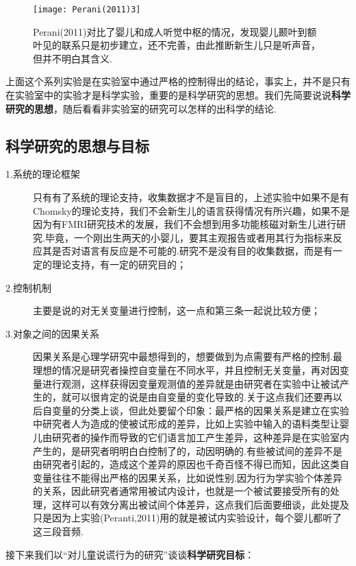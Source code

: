 \begin{figure}
	\texttt{[image: Perani(2011)3]}
	\caption[Perani(2011)3]{Perani(2011)对比了婴儿和成人听觉中枢的情况，发现婴儿颞叶到额叶见的联系只是初步建立，还不完善，由此推断新生儿只是听声音，但并不明白其含义.}
\end{figure}

上面这个系列实验是在实验室中通过严格的控制得出的结论，事实上，并不是只有在实验室中的实验才是科学实验，重要的是科学研究的思想。我们先简要说说\textbf{科学研究的思想}，随后看看非实验室的研究可以怎样的出科学的结论.

\subsection{科学研究的思想与目标}

\begin{description}
    \item[1.系统的理论框架]
    只有有了系统的理论支持，收集数据才不是盲目的，上述实验中如果不是有Chomsky的理论支持，我们不会新生儿的语言获得情况有所兴趣，如果不是因为有FMRI研究技术的发展，我们不会想到用多功能核磁对新生儿进行研究.毕竟，一个刚出生两天的小婴儿，要其主观报告或者用其行为指标来反应其是否对语言有反应是不可能的.研究不是没有目的收集数据，而是有一定的理论支持，有一定的研究目的；
    \item[2.控制机制]
    主要是说的对无关变量进行控制，这一点和第三条一起说比较方便；
    \item[3.对象之间的因果关系]
    因果关系是心理学研究中最想得到的，想要做到为点需要有严格的控制.最理想的情况是研究者操控自变量在不同水平，并且控制无关变量，再对因变量进行观测，这样获得因变量观测值的差异就是由研究者在实验中让被试产生的，就可以很肯定的说是由自变量的变化导致的.关于这点我们还要再以后自变量的分类上谈，但此处要留个印象：最严格的因果关系是建立在实验中研究者人为造成的使被试形成的差异，比如上实验中输入的语料类型让婴儿由研究者的操作而导致的它们语言加工产生差异，这种差异是在实验室内产生的，是研究者明明白白控制了的，动因明确的.有些被试间的差异不是由研究者引起的，造成这个差异的原因也千奇百怪不得已而知，因此这类自变量往往不能得出严格的因果关系，比如说性别.因为行为学实验个体差异的关系，因此研究者通常用被试内设计，也就是一个被试要接受所有的处理，这样可以有效分离出被试间个体差异，这点我们后面要细谈，此处提及只是因为上实验(Peranti,2011)用的就是被试内实验设计，每个婴儿都听了这三段音频.
\end{description}


接下来我们以“对儿童说谎行为的研究”谈谈\textbf{科学研究目标}：

